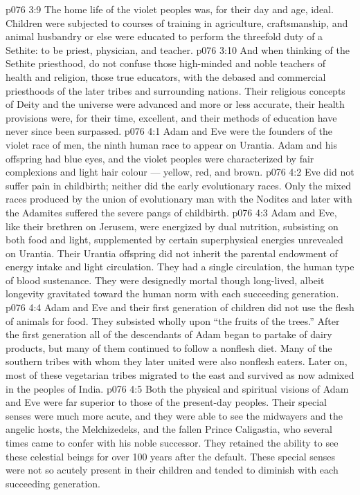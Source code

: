 \vs p076 3:9 The home life of the violet peoples was, for their day and age, ideal. Children were subjected to courses of training in agriculture, craftsmanship, and animal husbandry or else were educated to perform the threefold duty of a Sethite: to be priest, physician, and teacher.
\vs p076 3:10 And when thinking of the Sethite priesthood, do not confuse those high\hyp{}minded and noble teachers of health and religion, those true educators, with the debased and commercial priesthoods of the later tribes and surrounding nations. Their religious concepts of Deity and the universe were advanced and more or less accurate, their health provisions were, for their time, excellent, and their methods of education have never since been surpassed.
\vs p076 4:1 Adam and Eve were the founders of the violet race of men, the ninth human race to appear on Urantia. Adam and his offspring had blue eyes, and the violet peoples were characterized by fair complexions and light hair colour --- yellow, red, and brown.
\vs p076 4:2 Eve did not suffer pain in childbirth; neither did the early evolutionary races. Only the mixed races produced by the union of evolutionary man with the Nodites and later with the Adamites suffered the severe pangs of childbirth.
\vs p076 4:3 Adam and Eve, like their brethren on Jerusem, were energized by dual nutrition, subsisting on both food and light, supplemented by certain superphysical energies unrevealed on Urantia. Their Urantia offspring did not inherit the parental endowment of energy intake and light circulation. They had a single circulation, the human type of blood sustenance. They were designedly mortal though long\hyp{}lived, albeit longevity gravitated toward the human norm with each succeeding generation.
\vs p076 4:4 Adam and Eve and their first generation of children did not use the flesh of animals for food. They subsisted wholly upon “the fruits of the trees.” After the first generation all of the descendants of Adam began to partake of dairy products, but many of them continued to follow a nonflesh diet. Many of the southern tribes with whom they later united were also nonflesh eaters. Later on, most of these vegetarian tribes migrated to the east and survived as now admixed in the peoples of India.
\vs p076 4:5 Both the physical and spiritual visions of Adam and Eve were far superior to those of the present\hyp{}day peoples. Their special senses were much more acute, and they were able to see the midwayers and the angelic hosts, the Melchizedeks, and the fallen Prince Caligastia, who several times came to confer with his noble successor. They retained the ability to see these celestial beings for over 100 years after the default. These special senses were not so acutely present in their children and tended to diminish with each succeeding generation.
